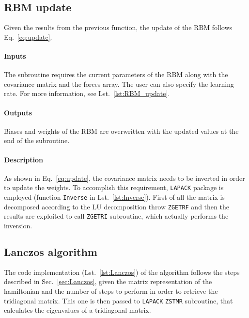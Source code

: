 \documentclass[a4paper,11pt]{article}
\begin{document}

\subsection{RBM update}

Given the results from the previous function, the update of the RBM follows Eq.~\ref{eq:update}.

\paragraph{Inputs}
The subroutine requires the current parameters of the RBM along with the covariance matrix and the forces array. The user can also specify the learning rate. For more information, see Lst.~\ref{lst:RBM_update}.

\paragraph{Outputs}
Biases and weights of the RBM are overwritten with the updated values at the end of the subroutine.

\paragraph{Description}
As shown in Eq.~\ref{eq:update}, the covariance matrix needs to be inverted in order to update the weights. To accomplish this requirement, \texttt{LAPACK} package is employed (function \texttt{Inverse} in Lst.~\ref{lst:Inverse}). First of all the matrix is decomposed according to the LU decomposition throw \texttt{ZGETRF} and then the results are exploited to call \texttt{ZGETRI} subroutine, which actually performs the inversion.


\subsection{Lanczos algorithm}

The code implementation (Lst.~\ref{lst:Lanczos}) of the algorithm follows the steps described in Sec.~\ref{sec:Lanczos}, given the matrix representation of the hamiltonian and the number of steps to perform in order to retrieve the tridiagonal matrix. This one is then passed to \texttt{LAPACK} \texttt{ZSTMR} subroutine, that calculates the eigenvalues of a tridiagonal matrix.
\end{document}
